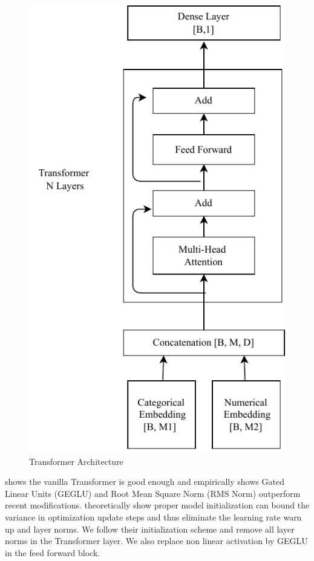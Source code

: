 \documentclass[11pt, letter,twocolumn]{article}
\begin{document}
 \begin{figure}[ht]
 \centering
 \caption{Transformer Architecture}
 \label{fig:transformerarchitecture}\vspace{1em}
 \includegraphics[width=0.8\linewidth]{imgs/transformer_architecture.pdf}
\end{figure}


\textcite{narang2021transformer} shows the vanilla Transformer is good enough and empirically shows Gated Linear Units (GEGLU) and Root Mean Square Norm (RMS Norm) outperform  recent modifications.  \textcite{huang_improving_2020} theoretically show   proper model initialization can bound the variance in optimization update steps and thus eliminate the learning rate warn up and  layer norms.   We follow their initialization scheme and remove all layer norms in the Transformer layer. We also replace non linear activation by GEGLU in the feed forward block. 
\end{document}
